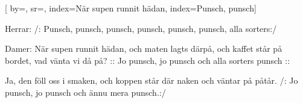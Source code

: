 

[ 		%
	by={},					%
	sr={},					%
	index={När supen runnit hädan}, %
	index={Punsch, punsch}]						%
	

\beginverse*						%
Herrar:
/: Punsch, punsch,
punsch, punsch,
punsch, punsch,
alla sorters:/
\endverse							%

\beginverse*						%
Damer:
När supen runnit hädan,
och maten lagts därpå,
och kaffet står på bordet,
vad vänta vi då på?
:: Jo punsch, jo punsch
och alla sorters punsch ::
\endverse							%

\beginverse*						%
Ja, den föll oss i smaken,
och koppen står där naken
och väntar på påtår.
/: Jo punsch, jo punsch
och ännu mera punsch.:/
\endverse


\endsong							%